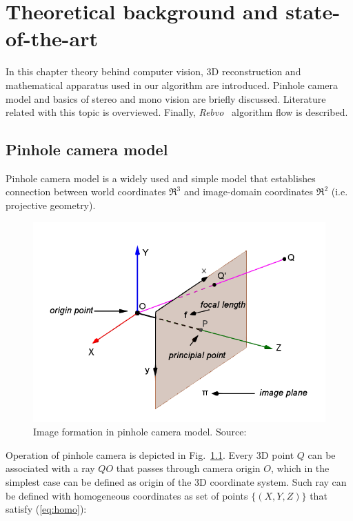 \chapter{Theoretical background and state-of-the-art}
\label{cha:intro}


In this chapter theory behind computer vision, 3D reconstruction and mathematical apparatus used in our algorithm are introduced. Pinhole camera model and basics of stereo and mono vision are briefly discussed. Literature related with this topic is overviewed. Finally, \textit{Rebvo}~\cite{jose2015realtime} algorithm flow is described.


\section{Pinhole camera model}
\label{sec:pinhole}

Pinhole camera model \cite{hartley2003multiple} is a widely used and simple model that establishes connection between world coordinates $\Re^3$ and image-domain coordinates $\Re^2$ (i.e. projective geometry).

\begin{figure}[ht]
	\centering\includegraphics[width=0.8\linewidth]{img/projective.PNG}
	\caption{Image formation in pinhole camera model. Source: \cite{szczesny}}
	\label{fig:projective}
\end{figure}

Operation of pinhole camera is depicted in Fig.~\ref{fig:projective}. Every 3D point $Q$ can be associated with a ray $QO$ that passes through camera origin $O$, which in the simplest case can be defined as origin of the 3D coordinate system. Such ray can be defined with homogeneous coordinates as set of points $\{(X, Y, Z)\}$ that satisfy (\ref{eq:homo}):


